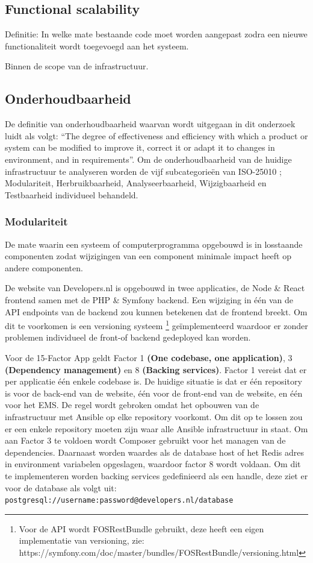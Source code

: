 \subsection{Functional scalability}
Definitie: In welke mate bestaande code moet worden aangepast zodra een nieuwe functionaliteit wordt toegevoegd aan het systeem.

Binnen de scope van de infrastructuur.

\subsection{Onderhoudbaarheid}
De definitie van onderhoudbaarheid waarvan wordt uitgegaan in dit onderzoek luidt als volgt: \enquote{The degree of effectiveness and efficiency with which a product or system can be modified to improve it, correct it or adapt it to changes in environment, and in requirements}. Om de onderhoudbaarheid van de huidige infrastructuur te analyseren worden de vijf subcategorieën van ISO-25010 \parencite{ISO25010}; Modulariteit, Herbruikbaarheid, Analyseerbaarheid, Wijzigbaarheid en Testbaarheid individueel behandeld.

\subsubsection{Modulariteit} %
De mate waarin een systeem of computerprogramma opgebouwd is in losstaande componenten zodat wijzigingen van een component minimale impact heeft op andere componenten.

De website van Developers.nl is opgebouwd in twee applicaties, de Node \& React frontend samen met de PHP \& Symfony backend. Een wijziging in één van de API endpoints van de backend zou kunnen betekenen dat de frontend breekt. Om dit te voorkomen is een versioning systeem \footnote{Voor de API wordt FOSRestBundle gebruikt, deze heeft een eigen implementatie van versioning, zie: https://symfony.com/doc/master/bundles/FOSRestBundle/versioning.html} geïmplementeerd waardoor er zonder problemen individueel de front-of backend gedeployed kan worden.

Voor de 15-Factor App geldt Factor 1 \textbf{(One codebase, one application)}, 3 \textbf{(Dependency management)} en 8 \textbf{(Backing services)}. Factor 1 vereist dat er per applicatie één enkele codebase is. De huidige situatie is dat er één repository is voor de back-end van de website, één voor de front-end van de website, en één voor het EMS. De regel wordt gebroken omdat het opbouwen van de infrastructuur met Ansible op elke repository voorkomt. Om dit op te lossen zou er een enkele repository moeten zijn waar alle Ansible infrastructuur in staat. Om aan Factor 3 te voldoen wordt Composer gebruikt voor het managen van de dependencies. Daarnaast worden waardes als de database host of het Redis adres in environment variabelen opgeslagen, waardoor factor 8 wordt voldaan. Om dit te implementeren worden backing services gedefinieerd als een handle, deze ziet er voor de database als volgt uit: \texttt{postgresql://username:password@developers.nl/database}

